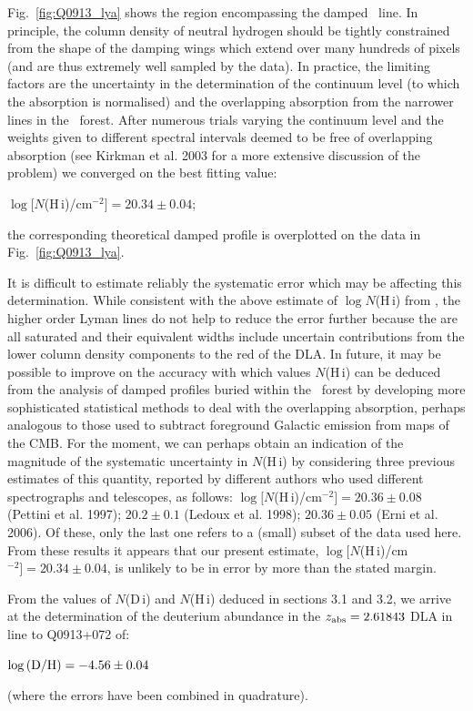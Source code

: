 \documentclass[useAMS,usenatbib]{mn2e}
\begin{document}
Fig.~\ref{fig:Q0913_lya} shows the region encompassing
the damped \lya\ line. In principle, the column density
of neutral hydrogen should be tightly constrained from
the shape of the damping wings which extend
over many hundreds of pixels (and are thus extremely
well sampled by the data).
In practice, the limiting factors are the uncertainty in the
determination of the continuum level (to which the
absorption is normalised) and the overlapping absorption
from the narrower lines in the \lya\ forest.
After numerous trials varying the continuum level
and the weights given to different spectral intervals
deemed to be free of overlapping absorption
(see Kirkman et al. 2003 for a more extensive discussion
of the problem) we converged on the best fitting value:
\begin{center}
$\log [N$(H\,{\sc i})/cm$^{-2}] = 20.34\pm 0.04$;
\end{center}
the corresponding theoretical damped profile is
overplotted on the data in Fig.~\ref{fig:Q0913_lya}.

It is difficult to estimate reliably the systematic
error which may be affecting this determination.
While consistent with the above estimate of
$\log N$(H\,{\sc i}) from \lya,
the higher order Lyman lines do not help to reduce
the error further because the are all saturated and
their equivalent widths include uncertain contributions
from the lower column density components to the red
of the DLA.
In future, it may be possible to improve on the
accuracy with which values $N$(H\,{\sc i}) can
be deduced from the analysis of
damped profiles buried within the \lya\ forest
by developing more sophisticated statistical methods
to deal with the overlapping absorption, perhaps
analogous to those used to subtract foreground
Galactic emission from maps of the CMB.
For the moment, we can perhaps obtain an
indication of the magnitude of the systematic
uncertainty in $N$(H\,{\sc i}) by considering
three previous estimates of this quantity,
reported by different authors who used different
spectrographs and telescopes,
as follows:
$\log [N$(H\,{\sc i})/cm$^{-2}] = 20.36\pm 0.08$
(Pettini et al. 1997); $20.2 \pm 0.1$ (Ledoux et al. 1998);
$20.36 \pm 0.05$ (Erni et al. 2006).
Of these, only the last one refers to a (small)
subset of the data used here.
From these results it appears that our present estimate,
$\log [N$(H\,{\sc i})/cm$^{-2}] = 20.34\pm 0.04$,
is unlikely to be in error by more than the
stated margin.

From the values of $N$(D\,{\sc i}) and
$N$(H\,{\sc i}) deduced in sections 3.1 and 3.2,
we arrive at the determination of the deuterium
abundance in the $z_{\rm abs} = 2.61843$ DLA in
line to Q0913+072 of:
\begin{center}
$\log {\rm (D/H)} = -4.56 \pm 0.04$
\end{center}
(where the errors have been combined in quadrature).
\end{document}
